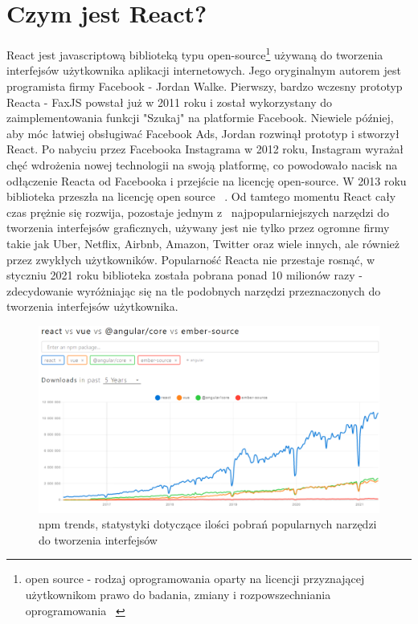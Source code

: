 \documentclass[oneside,polski,logo,indent]{amuthesis}
\begin{document}
\section{Czym jest React?}
{
React jest javascriptową biblioteką typu open-source\footnote{open source - rodzaj oprogramowania oparty na licencji przyznającej użytkownikom prawo do badania, zmiany i rozpowszechniania oprogramowania ~\cite{opensourcewiki}} używaną do tworzenia interfejsów użytkownika aplikacji internetowych. Jego oryginalnym autorem jest programista firmy Facebook - Jordan Walke. Pierwszy, bardzo wczesny prototyp Reacta - FaxJS powstał już w 2011 roku i został wykorzystany do zaimplementowania funkcji "Szukaj" na platformie Facebook. Niewiele później, aby móc łatwiej obsługiwać Facebook Ads, Jordan rozwinął prototyp i stworzył React. Po nabyciu przez Facebooka Instagrama w 2012 roku, Instagram wyrażał chęć wdrożenia nowej technologii na swoją platformę, co powodowało nacisk na odłączenie Reacta od Facebooka i przejście na licencję open-source. W 2013 roku biblioteka przeszła na licencję open source ~\cite{reactstory}. 
\newline
Od tamtego momentu React cały czas prężnie się rozwija, pozostaje jednym z~ najpopularniejszych narzędzi do tworzenia interfejsów graficznych, używany jest nie tylko przez ogromne firmy takie jak Uber, Netflix, Airbnb, Amazon, Twitter oraz wiele innych, ale również przez zwykłych użytkowników. Popularność Reacta nie przestaje rosnąć, w styczniu 2021 roku biblioteka została pobrana ponad 10 milionów razy - zdecydowanie wyróżniając się na tle podobnych narzędzi przeznaczonych do tworzenia interfejsów użytkownika.

\begin{figure}
\centering
\includegraphics[width=14cm]{statystyki react vue angular.png}
\caption{npm trends, statystyki dotyczące ilości pobrań popularnych narzędzi do tworzenia interfejsów}
\label{statystyki react vue angular.png}
\end{figure}

}
\end{document}
